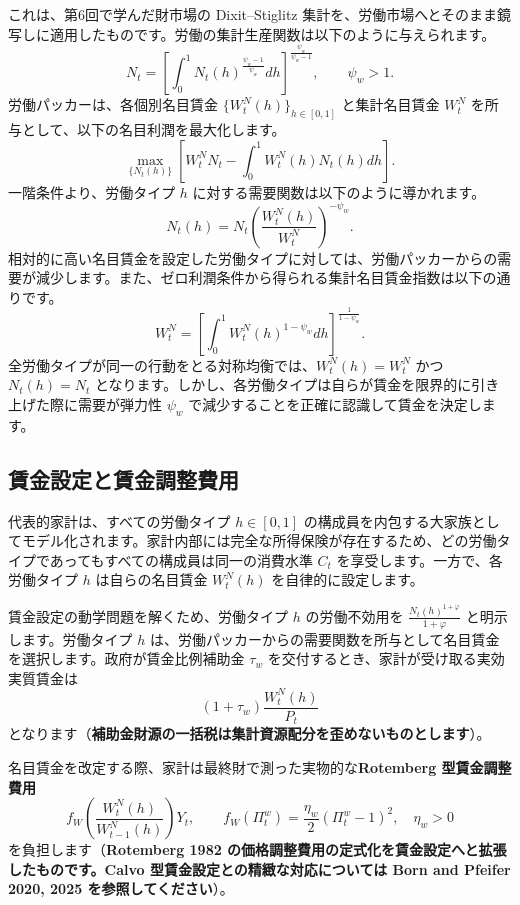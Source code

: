 \documentclass[
  japanese,
  lualatex,
  ja=standard,
  12pt,
  a4paper]{ltjsarticle}
\begin{document}
これは、第6回で学んだ財市場の Dixit--Stiglitz
集計を、労働市場へとそのまま鏡写しに適用したものです。労働の集計生産関数は以下のように与えられます。
\[
N_t
=
\left[
\int_0^1
N_t(h)^{\frac{\psi_w-1}{\psi_w}}dh
\right]^{\frac{\psi_w}{\psi_w-1}},
\qquad
\psi_w>1.
\] 労働パッカーは、各個別名目賃金 \(\{W_t^N(h)\}_{h\in[0,1]}\)
と集計名目賃金 \(W_t^N\) を所与として、以下の名目利潤を最大化します。 \[
\max_{\{N_t(h)\}} \left[ W_t^N N_t-\int_0^1 W_t^N(h)N_t(h)dh \right].
\] 一階条件より、労働タイプ \(h\)
に対する需要関数は以下のように導かれます。 \[
N_t(h)
=
N_t
\left(
\frac{W_t^N(h)}{W_t^N}
\right)^{-\psi_w}.
\]
相対的に高い名目賃金を設定した労働タイプに対しては、労働パッカーからの需要が減少します。また、ゼロ利潤条件から得られる集計名目賃金指数は以下の通りです。
\[
W_t^N
=
\left[
\int_0^1
W_t^N(h)^{1-\psi_w}dh
\right]^{\frac{1}{1-\psi_w}}.
\] 全労働タイプが同一の行動をとる対称均衡では、\(W_t^N(h)=W_t^N\) かつ
\(N_t(h)=N_t\)
となります。しかし、各労働タイプは自らが賃金を限界的に引き上げた際に需要が弾力性
\(\psi_w\) で減少することを正確に認識して賃金を決定します。

\subsection{賃金設定と賃金調整費用}\label{ux8cc3ux91d1ux8a2dux5b9aux3068ux8cc3ux91d1ux8abfux6574ux8cbbux7528}

代表的家計は、すべての労働タイプ \(h\in[0,1]\)
の構成員を内包する大家族としてモデル化されます。家計内部には完全な所得保険が存在するため、どの労働タイプであってもすべての構成員は同一の消費水準
\(C_t\) を享受します。一方で、各労働タイプ \(h\) は自らの名目賃金
\(W_t^N(h)\) を自律的に設定します。

賃金設定の動学問題を解くため、労働タイプ \(h\) の労働不効用を
\(\frac{N_t(h)^{1+\varphi}}{1+\varphi}\) と明示します。労働タイプ \(h\)
は、労働パッカーからの需要関数を所与として名目賃金を選択します。政府が賃金比例補助金
\(\tau_w\) を交付するとき、家計が受け取る実効実質賃金は \[
(1+\tau_w)\frac{W_t^N(h)}{P_t}
\]
となります（\textbf{補助金財源の一括税は集計資源配分を歪めないものとします}）。

名目賃金を改定する際、家計は最終財で測った実物的な\textbf{Rotemberg
型賃金調整費用} \[
f_W\left(\frac{W_t^N(h)}{W_{t-1}^N(h)}\right)Y_t,
\qquad
f_W(\Pi_t^w)=\frac{\eta_w}{2}(\Pi_t^w-1)^2,
\quad
\eta_w>0
\] を負担します（\textbf{Rotemberg 1982
の価格調整費用の定式化を賃金設定へと拡張したものです。Calvo
型賃金設定との精緻な対応については Born and Pfeifer 2020, 2025
を参照してください}）。
\end{document}
